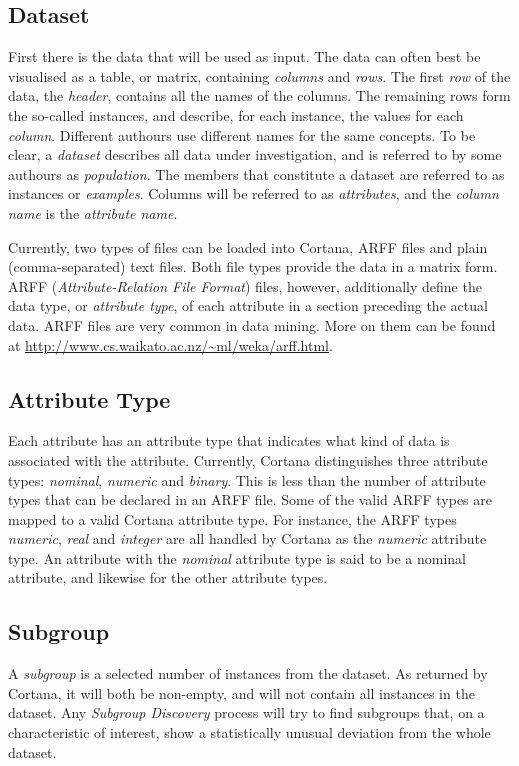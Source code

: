 \documentclass{article}
\begin{document}
\subsection{Dataset}
\label{preliminaries:dataset}
First there is the data that will be used as input.
The data can often best be visualised as a table, or matrix, containing \emph{columns} and \emph{rows}.
The first \emph{row} of the data, the \emph{header}, contains all the names of the columns.
The remaining rows form the so-called instances, and describe, for each instance, the values for each \emph{column}.
Different authours use different names for the same concepts.
To be clear, a \emph{dataset} describes all data under investigation, and is referred to by some authours as \emph{population}.
The members that constitute a dataset are referred to as instances or \emph{examples}.
Columns will be referred to as \emph{attributes}, and the \emph{column name} is the \emph{attribute name}.

Currently, two types of files can be loaded into Cortana, ARFF files and plain (comma-separated) text files.
Both file types provide the data in a matrix form.
ARFF (\emph{Attribute-Relation File Format}) files, however, additionally define the data type, or \emph{attribute type}, of each attribute in a section preceding the actual data.
ARFF files are very common in data mining.
More on them can be found at \url{http://www.cs.waikato.ac.nz/~ml/weka/arff.html}.



\subsection{Attribute Type}
\label{preliminaries:attribute-type}
Each attribute has an attribute type that indicates what kind of data is associated with the attribute.
Currently, Cortana distinguishes three attribute types: \emph{nominal}, \emph{numeric} and \emph{binary}.
This is less than the number of attribute types that can be declared in an ARFF file.
Some of the valid ARFF types are mapped to a valid Cortana attribute type.
For instance, the ARFF types \emph{numeric}, \emph{real} and \emph{integer} are all handled by Cortana as the \emph{numeric} attribute type.
An attribute with the \emph{nominal} attribute type is said to be a nominal attribute, and likewise for the other attribute types.



\subsection{Subgroup}
\label{preliminaries:subgroup}
A \emph{subgroup} is a selected number of instances from the dataset.
As returned by Cortana, it will both be non-empty, and will not contain all instances in the dataset.
Any \emph{Subgroup Discovery} process will try to find subgroups that, on a characteristic of interest, show a statistically unusual deviation from the whole dataset.
\end{document}
